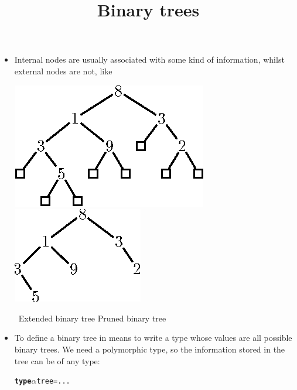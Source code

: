 \documentclass[wide]{slides}
\begin{document}
\begin{slide}
  \title{Binary trees}

  \begin{itemize}

    \item Internal nodes are usually associated with some kind of
      information, whilst external nodes are not, like
      \begin{center}
        \includegraphics[bb=148 586 266 662]{bt_ex1.eps}
        \qquad
        \includegraphics[bb=158 584 236 661]{bt_ex2.eps}
      \end{center}
      \centerline{\qquad\qquad\ Extended binary tree \qquad\qquad\quad Pruned binary tree}

    \item To define a binary tree in \OCaml means to write a type
      whose values are all possible binary trees. We need a
      polymorphic type, so the information stored in the tree can be
      of any type:
      \smallskip
      \begin{alltt}
        \textbf{type} \(\alpha\) tree = ...
      \end{alltt}

  \end{itemize}

\end{slide}
\end{document}

